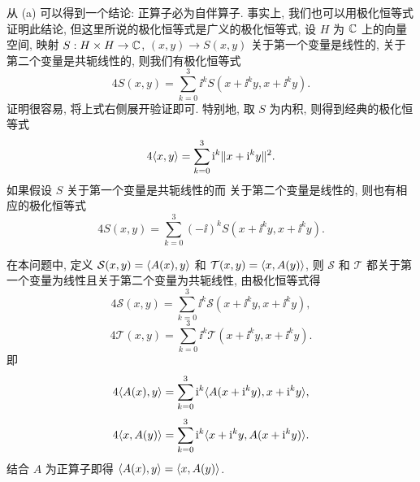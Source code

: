 \begin{remark}
    从 (a) 可以得到一个结论: 正算子必为自伴算子. 事实上, 我们也可以用极化恒等式证明此结论,
    但这里所说的极化恒等式是广义的极化恒等式, 设 $H$ 为 $\mathbb{C}$ 上的向量空间,
    映射 $S:H\times H\to\mathbb{C}$, $(x,y)\to S(x,y)$ 关于第一个变量是线性的,
    关于第二个变量是共轭线性的, 则我们有极化恒等式
    \[4S(x,y)=\sum_{k=0}^3 \ii^k S(x+\ii^k y,x+\ii^k y).\]
    证明很容易, 将上式右侧展开验证即可. 特别地, 取 $S$ 为内积, 则得到经典的极化恒等式
    \[4\langle x,y\rangle=\sum_{k=0}^3 \mathrm{i}^k\|x+\mathrm{i}^k y\|^2.\]
    如果假设 $S$ 关于第一个变量是共轭线性的而
    关于第二个变量是线性的, 则也有相应的极化恒等式
    \[4S(x,y)=\sum_{k=0}^3(-\ii)^k S(x+\ii^k y,x+\ii^k y).\]

    在本问题中, 定义 $\mathcal{S}(x,y)=\langle A(x),y\rangle$ 和 $\mathcal{T}(x,y)=\langle x,A(y)\rangle$,
    则 $\mathcal{S}$ 和 $\mathcal{T}$ 都关于第一个变量为线性且关于第二个变量为共轭线性,
    由极化恒等式得
    \[4\mathcal{S}(x,y)=\sum_{k=0}^3 \ii^k \mathcal{S}(x+\ii^k y,x+\ii^k y),\]
    \[4\mathcal{T}(x,y)=\sum_{k=0}^3 \ii^k \mathcal{T}(x+\ii^k y,x+\ii^k y).\]
    即
    \[4\langle A(x),y\rangle=\sum_{k=0}^3 \mathrm{i}^k \langle A(x+\mathrm{i}^k y),x+\mathrm{i}^k y\rangle,\]
    \[4\langle x,A(y)\rangle=\sum_{k=0}^3 \mathrm{i}^k \langle x+\mathrm{i}^k y,A(x+\mathrm{i}^k y)\rangle.\]
    结合 $A$ 为正算子即得 $\langle A(x),y\rangle=\langle x,A(y)\rangle$.
\end{remark}